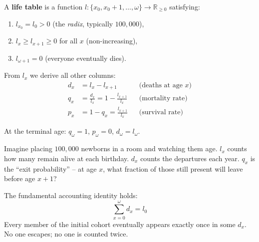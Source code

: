 \documentclass[11pt,a4paper]{article}
\theoremstyle{definition}
\newcommand{\R}{\mathbb{R}}
\begin{document}
\begin{formaldef}
A \textbf{life table} is a function $l: \{x_0, x_0+1, \ldots, \omega\} \to \R_{\geq 0}$
satisfying:
\begin{enumerate}[label=(\roman*)]
  \item $l_{x_0} = l_0 > 0$ (the \emph{radix}, typically $100{,}000$),
  \item $l_x \geq l_{x+1} \geq 0$ for all $x$ (non-increasing),
  \item $l_{\omega+1} = 0$ (everyone eventually dies).
\end{enumerate}

From $l_x$ we derive all other columns:
\begin{align}
  d_x &= l_x - l_{x+1} & &\text{(deaths at age $x$)} \label{eq:dx} \\
  q_x &= \frac{d_x}{l_x} = 1 - \frac{l_{x+1}}{l_x} & &\text{(mortality rate)} \label{eq:qx} \\
  p_x &= 1 - q_x = \frac{l_{x+1}}{l_x} & &\text{(survival rate)} \label{eq:px}
\end{align}

At the terminal age: $q_\omega = 1$, $p_\omega = 0$, $d_\omega = l_\omega$.
\end{formaldef}

\begin{intuition}
Imagine placing $100{,}000$ newborns in a room and watching them age.
$l_x$ counts how many remain alive at each birthday. $d_x$ counts the
departures each year. $q_x$ is the ``exit probability'' -- at age $x$,
what fraction of those still present will leave before age $x+1$?

The fundamental accounting identity holds:
\[
  \sum_{x=0}^{\omega} d_x = l_0
\]
Every member of the initial cohort eventually appears exactly once in some $d_x$.
No one escapes; no one is counted twice.
\end{intuition}
\end{document}

